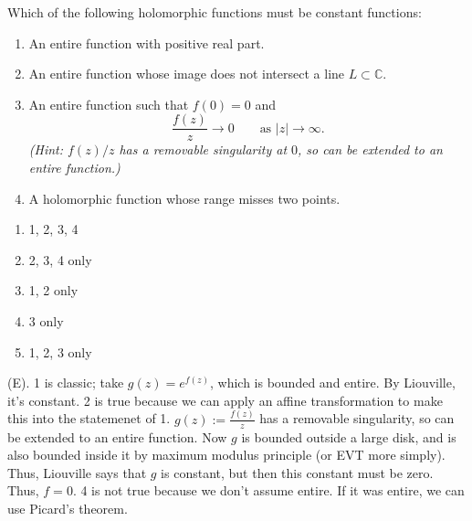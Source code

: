 \begin{exercise}
Which of the following holomorphic functions must be constant functions:

\begin{enumerate}
    \item An entire function with positive real part.
    
    \item An entire function whose image does not intersect a line $L \subset \mathbb{C}$.
    
    \item An entire function such that $f(0)=0$ and
    \[
    \frac{f(z)}{z}\to 0
    \qquad\text{as } |z|\to\infty.
    \]
    \textit{(Hint: $f(z)/z$ has a removable singularity at $0$, so can be extended to an entire function.)}
    
    \item A holomorphic function whose range misses two points.
\end{enumerate}

\begin{enumerate}[label=(\Alph*)]
    \item 1, 2, 3, 4
    \item 2, 3, 4 only
    \item 1, 2 only
    \item 3 only
    \item 1, 2, 3 only
\end{enumerate}
\end{exercise}
\begin{solution}
(E). 1 is classic; take $g(z) = e^{f(z)}$, which is bounded and entire. By Liouville, it's constant. 
2 is true because we can apply an affine transformation to make this into the statemenet of 1. 
$g(z) := \frac{f(z)}{z}$ has a removable singularity, so can be extended to an entire function.
Now $g$ is bounded outside a large disk, and is also bounded inside it by maximum modulus principle 
(or EVT more simply). Thus, Liouville says that $g$ is constant, but then this constant must be zero. Thus, $f = 0$.
4 is not true because we don't assume entire. If it was entire, we can use Picard's theorem.
\end{solution}

